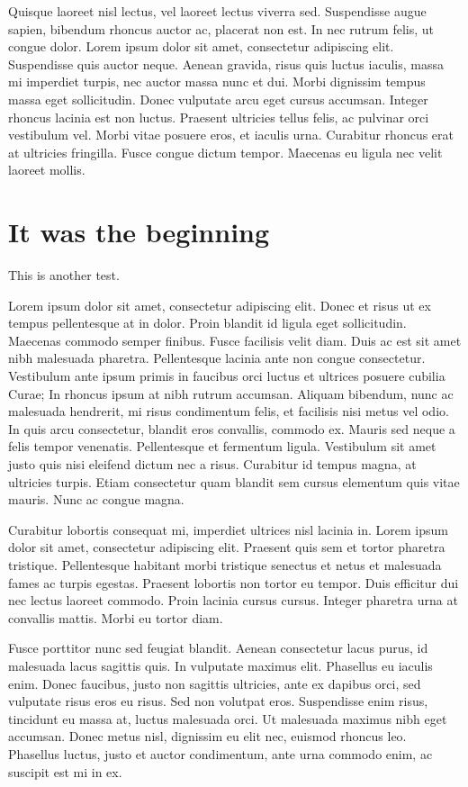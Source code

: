 \documentclass[notitlepage]{article}
\begin{document}
Quisque laoreet nisl lectus, vel laoreet lectus viverra sed. Suspendisse augue sapien, bibendum rhoncus auctor ac, placerat non est. In nec rutrum felis, ut congue dolor. Lorem ipsum dolor sit amet, consectetur adipiscing elit. Suspendisse quis auctor neque. Aenean gravida, risus quis luctus iaculis, massa mi imperdiet turpis, nec auctor massa nunc et dui. Morbi dignissim tempus massa eget sollicitudin. Donec vulputate arcu eget cursus accumsan. Integer rhoncus lacinia est non luctus. Praesent ultricies tellus felis, ac pulvinar orci vestibulum vel. Morbi vitae posuere eros, et iaculis urna. Curabitur rhoncus erat at ultricies fringilla. Fusce congue dictum tempor. Maecenas eu ligula nec velit laoreet mollis. 
    \section{It was the beginning}\label{sec:beg}
        This is another test.


Lorem ipsum dolor sit amet, consectetur adipiscing elit. Donec et risus ut ex tempus pellentesque at in dolor. Proin blandit id ligula eget sollicitudin. Maecenas commodo semper finibus. Fusce facilisis velit diam. Duis ac est sit amet nibh malesuada pharetra. Pellentesque lacinia ante non congue consectetur. Vestibulum ante ipsum primis in faucibus orci luctus et ultrices posuere cubilia Curae; In rhoncus ipsum at nibh rutrum accumsan. Aliquam bibendum, nunc ac malesuada hendrerit, mi risus condimentum felis, et facilisis nisi metus vel odio. In quis arcu consectetur, blandit eros convallis, commodo ex. Mauris sed neque a felis tempor venenatis. Pellentesque et fermentum ligula. Vestibulum sit amet justo quis nisi eleifend dictum nec a risus. Curabitur id tempus magna, at ultricies turpis. Etiam consectetur quam blandit sem cursus elementum quis vitae mauris. Nunc ac congue magna.

Curabitur lobortis consequat mi, imperdiet ultrices nisl lacinia in. Lorem ipsum dolor sit amet, consectetur adipiscing elit. Praesent quis sem et tortor pharetra tristique. Pellentesque habitant morbi tristique senectus et netus et malesuada fames ac turpis egestas. Praesent lobortis non tortor eu tempor. Duis efficitur dui nec lectus laoreet commodo. Proin lacinia cursus cursus. Integer pharetra urna at convallis mattis. Morbi eu tortor diam.

Fusce porttitor nunc sed feugiat blandit. Aenean consectetur lacus purus, id malesuada lacus sagittis quis. In vulputate maximus elit. Phasellus eu iaculis enim. Donec faucibus, justo non sagittis ultricies, ante ex dapibus orci, sed vulputate risus eros eu risus. Sed non volutpat eros. Suspendisse enim risus, tincidunt eu massa at, luctus malesuada orci. Ut malesuada maximus nibh eget accumsan. Donec metus nisl, dignissim eu elit nec, euismod rhoncus leo. Phasellus luctus, justo et auctor condimentum, ante urna commodo enim, ac suscipit est mi in ex.
\end{document}
